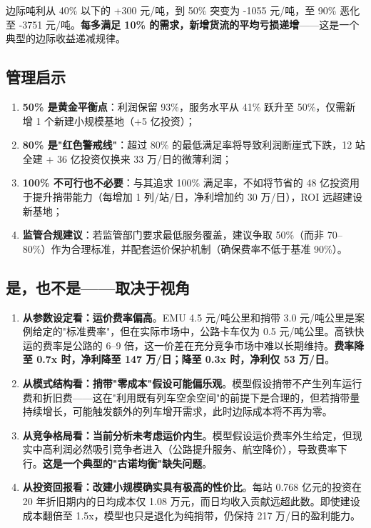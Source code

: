 \documentclass[12pt,a4paper,fontset=none]{ctexart}
\begin{document}
边际吨利从 40\% 以下的 +300 元/吨，到 50\% 突变为 -1055 元/吨，至 90\% 恶化至 -3751 元/吨。\textbf{每多满足 10\% 的需求，新增货流的平均亏损递增}——这是一个典型的边际收益递减规律。

\subsection{管理启示}

\begin{enumerate}[leftmargin=*]
    \item \textbf{50\% 是黄金平衡点}：利润保留 93\%，服务水平从 41\% 跃升至 50\%，仅需新增 1 个新建小规模基地（+5 亿投资）；
    \item \textbf{80\% 是"红色警戒线"}：超过 80\% 的最低满足率将导致利润断崖式下跌，12 站全建 + 36 亿投资仅换来 33 万/日的微薄利润；
    \item \textbf{100\% 不可行也不必要}：与其追求 100\% 满足率，不如将节省的 48 亿投资用于提升捎带能力（每增加 1 列/站/日，净利增加约 30 万/日），ROI 远超建设新基地；
    \item \textbf{监管合规建议}：若监管部门要求最低服务覆盖，建议争取 50\%（而非 70--80\%）作为合理标准，并配套运价保护机制（确保费率不低于基准 90\%）。
\end{enumerate}

\subsection{是，也不是——取决于视角}

\begin{enumerate}[leftmargin=*]

\item \textbf{从参数设定看：运价费率偏高}。EMU 4.5 元/吨公里和捎带 3.0 元/吨公里是案例给定的"标准费率"，但在实际市场中，公路卡车仅为 0.5 元/吨公里。高铁快运的费率是公路的 6--9 倍，这一价差在充分竞争市场中难以长期维持。\textbf{费率降至 0.7x 时，净利降至 147 万/日；降至 0.3x 时，净利仅 53 万/日}。

\item \textbf{从模式结构看：捎带"零成本"假设可能偏乐观}。模型假设捎带不产生列车运行费和折旧费——这在"利用既有列车空余空间"的前提下是合理的，但若捎带量持续增长，可能触发额外的列车增开需求，此时边际成本将不再为零。

\item \textbf{从竞争格局看：当前分析未考虑运价内生}。模型假设运价费率外生给定，但现实中高利润必然吸引竞争者进入（公路提升服务、航空降价），导致费率下行。\textbf{这是一个典型的"古诺均衡"缺失问题}。

\item \textbf{从投资回报看：改建小规模确实具有极高的性价比}。每站 0.768 亿元的投资在 20 年折旧期内的日均成本仅 1.08 万元，而日均收入贡献远超此数。即使建设成本翻倍至 1.5x，模型也只是退化为纯捎带，仍保持 217 万/日的盈利能力。

\end{enumerate}
\end{document}
